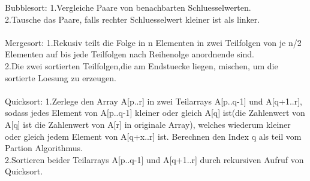 \documentclass[a4paper,12pt]{article}
\begin{document}
Bubblesort: 
1.Vergleiche Paare von benachbarten Schluesselwerten.\\
2.Tausche das Paare, falls rechter Schluesselwert kleiner ist als linker.\\
\\
Mergesort:
1.Rekusiv teilt die Folge in n Elementen in zwei Teilfolgen von je n/2 Elementen auf bis jede Teilfolgen nach Reihenolge anordnende sind.\\
2.Die zwei sortierten Teilfolgen,die am Endstuecke liegen, mischen, um die sortierte Loesung zu erzeugen.\\
\\
Quicksort:
1.Zerlege den Array A[p..r] in zwei Teilarrays A[p..q-1] und A[q+1..r], sodass jedes Element von A[p..q-1] kleiner oder gleich A[q] ist(die Zahlenwert von A[q] ist die Zahlenwert von A[r] in originale Array), welches wiederum kleiner oder gleich jedem Element von A[q+x..r] ist. Berechnen den Index q als teil vom Partion Algorithmus.\\
2.Sortieren beider Teilarrays A[p..q-1] und A[q+1..r] durch rekursiven Aufruf von Quicksort.
\end{document}
